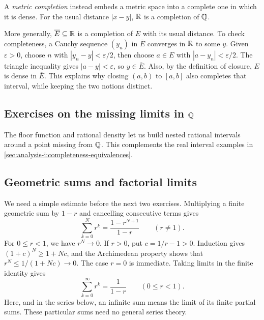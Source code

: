 A \emph{metric completion} instead embeds a metric space into a complete
one in which it is dense. For the usual distance $|x-y|$, $\mathbb{R}$ is a
completion of $\mathbb{Q}$.

More generally, $\overline E\subseteq\mathbb{R}$ is a completion of $E$ with its
usual distance. To check completeness, a Cauchy sequence $(y_n)$ in
$\overline E$ converges in $\mathbb{R}$ to some $y$. Given $\varepsilon>0$, choose
$n$ with $|y_n-y|<\varepsilon/2$, then choose $a\in E$ with
$|a-y_n|<\varepsilon/2$. The triangle inequality gives $|a-y|<\varepsilon$,
so $y\in\overline E$. Also, by the definition of closure, $E$ is dense
in $\overline E$. This explains why closing $(a,b)$ to $[a,b]$ also
completes that interval, while keeping the two notions distinct.

\subsection{Exercises on the missing limits in $\mathbb{Q}$}
The floor function and rational density let us build nested rational
intervals around a point missing from $\mathbb{Q}$. This complements the real
interval examples in \autoref{sec:analysis-i:completeness-equivalences}.



\subsection{Geometric sums and factorial limits}
We need a simple estimate before the next two exercises.
Multiplying a finite geometric sum by $1-r$ and cancelling consecutive
terms gives
\[
  \sum_{k=0}^{N}r^k=\frac{1-r^{N+1}}{1-r}\qquad(r\ne1).
\]
For $0\leq r<1$, we have $r^N\to0$. If $r>0$, put $c=1/r-1>0$.
Induction gives $(1+c)^N\geq1+Nc$, and the Archimedean property shows
that $r^N\leq1/(1+Nc)\to0$. The case $r=0$ is immediate.
Taking limits in the finite identity gives
\begin{equation}
  \sum_{k=0}^{\infty}r^k=\frac1{1-r}\qquad(0\leq r<1).
  \label{eq:analysis-i:geometric-sum}
\end{equation}
Here, and in the series below, an infinite sum means the limit of its
finite partial sums. These particular sums need no general series theory.

